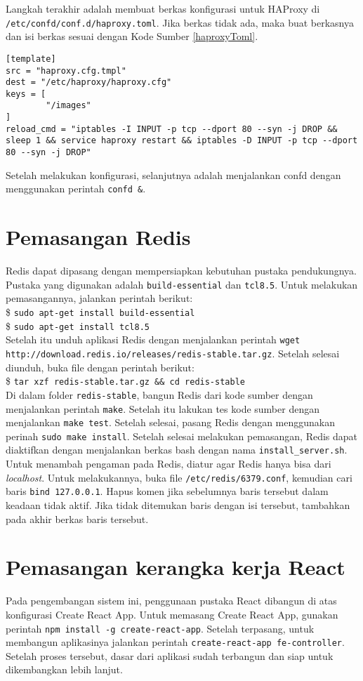 	Langkah terakhir adalah membuat berkas konfigurasi untuk HAProxy di \texttt{/etc/confd/conf.d/haproxy.toml}. Jika berkas tidak ada, maka buat berkasnya dan isi berkas sesuai dengan Kode Sumber \ref{haproxyToml}.
	\begin{lstlisting}[frame=single,tabsize=2,breaklines,caption={Isi Berkas haproxy.toml},label=haproxyToml, captionpos=b]
[template]
src = "haproxy.cfg.tmpl"
dest = "/etc/haproxy/haproxy.cfg"
keys = [
        "/images"
]
reload_cmd = "iptables -I INPUT -p tcp --dport 80 --syn -j DROP && sleep 1 && service haproxy restart && iptables -D INPUT -p tcp --dport 80 --syn -j DROP"
	\end{lstlisting}
    
    Setelah melakukan konfigurasi, selanjutnya adalah menjalankan confd dengan menggunakan perintah \texttt{confd \&}.

\section*{Pemasangan Redis} \label{install:redis}
	Redis dapat dipasang dengan mempersiapkan kebutuhan pustaka pendukungnya. Pustaka yang digunakan adalah \texttt{build-essential} dan \texttt{tcl8.5}. Untuk melakukan pemasangannya, jalankan perintah berikut:\\
	 \$ \texttt{sudo apt-get install build-essential}\\
     \$ \texttt{sudo apt-get install tcl8.5}\\
     \indent Setelah itu unduh aplikasi Redis dengan menjalankan perintah \texttt{wget http://download.redis.io/releases/redis-stable.tar.gz}. Setelah selesai diunduh, buka file dengan perintah berikut:\\
     \$ \texttt{tar xzf redis-stable.tar.gz \&\& cd redis-stable}\\
     \indent Di dalam folder \texttt{redis-stable}, bangun Redis dari kode sumber dengan menjalankan perintah \texttt{make}. Setelah itu lakukan tes kode sumber dengan menjalankan \texttt{make test}. Setelah selesai, pasang Redis dengan menggunakan perinah \texttt{sudo make install}. Setelah selesai melakukan pemasangan, Redis dapat diaktifkan dengan menjalankan berkas bash dengan nama \texttt{install\_server.sh}.\\
     Untuk menambah pengaman pada Redis, diatur agar Redis hanya bisa dari \textit{localhost}. Untuk melakukannya, buka file \texttt{/etc/redis/6379.conf}, kemudian cari baris \texttt{bind 127.0.0.1}. Hapus komen jika sebelumnya baris tersebut dalam keadaan tidak aktif. Jika tidak ditemukan baris dengan isi tersebut, tambahkan pada akhir berkas baris tersebut.

\section*{Pemasangan kerangka kerja React}
	Pada pengembangan sistem ini, penggunaan pustaka React dibangun di atas konfigurasi Create React App. Untuk memasang Create React App, gunakan perintah \texttt{npm install -g create-react-app}. Setelah terpasang, untuk membangun aplikasinya jalankan perintah \texttt{create-react-app fe-controller}. Setelah proses tersebut, dasar dari aplikasi sudah terbangun dan siap untuk dikembangkan lebih lanjut.